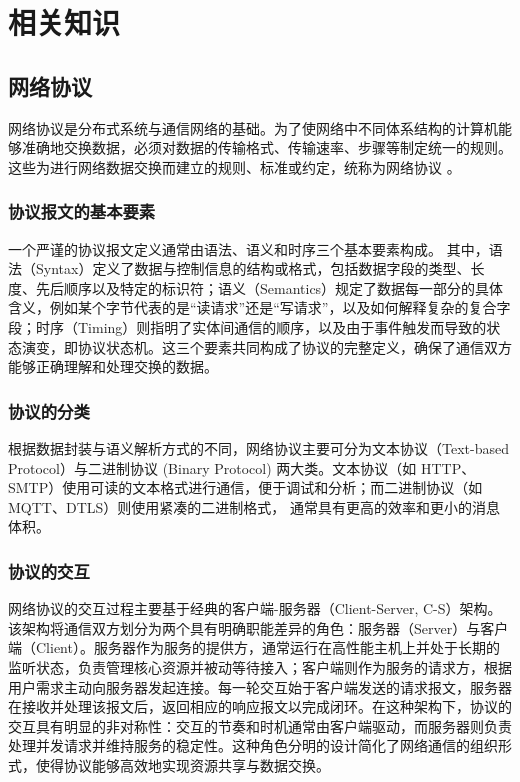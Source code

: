 \chapter{相关知识}

\section{网络协议}

网络协议是分布式系统与通信网络的基础。为了使网络中不同体系结构的计算机能够准确地交换数据，必须对数据的传输格式、传输速率、步骤等制定统一的规则。这些为进行网络数据交换而建立的规则、标准或约定，统称为网络协议 \cite{tanenbaum2011computer}。

\subsection{协议报文的基本要素}

一个严谨的协议报文定义通常由语法、语义和时序三个基本要素构成。
其中，语法（Syntax）定义了数据与控制信息的结构或格式，包括数据字段的类型、长度、先后顺序以及特定的标识符；语义（Semantics）规定了数据每一部分的具体含义，例如某个字节代表的是“读请求”还是“写请求”，以及如何解释复杂的复合字段；时序（Timing）则指明了实体间通信的顺序，以及由于事件触发而导致的状态演变，即协议状态机。这三个要素共同构成了协议的完整定义，确保了通信双方能够正确理解和处理交换的数据。

\subsection{协议的分类}

根据数据封装与语义解析方式的不同，网络协议主要可分为文本协议（Text-based Protocol）与二进制协议 (Binary Protocol) 两大类。文本协议（如 HTTP、SMTP）使用可读的文本格式进行通信，便于调试和分析；而二进制协议（如 MQTT、DTLS）则使用紧凑的二进制格式，
通常具有更高的效率和更小的消息体积。

\subsection{协议的交互}

网络协议的交互过程主要基于经典的客户端-服务器（Client-Server, C-S）架构。该架构将通信双方划分为两个具有明确职能差异的角色：服务器（Server）与客户端（Client）。服务器作为服务的提供方，通常运行在高性能主机上并处于长期的监听状态，负责管理核心资源并被动等待接入；客户端则作为服务的请求方，根据用户需求主动向服务器发起连接。每一轮交互始于客户端发送的请求报文，服务器在接收并处理该报文后，返回相应的响应报文以完成闭环。在这种架构下，协议的交互具有明显的非对称性：交互的节奏和时机通常由客户端驱动，而服务器则负责处理并发请求并维持服务的稳定性。这种角色分明的设计简化了网络通信的组织形式，使得协议能够高效地实现资源共享与数据交换。

